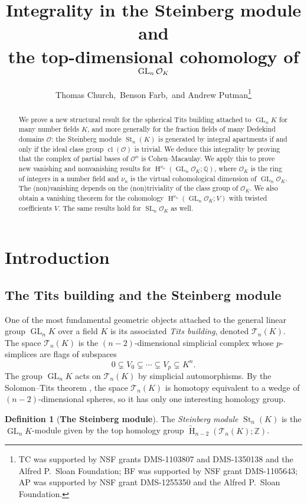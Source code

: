 \documentclass[11 pt]{article}
\title{Integrality in the Steinberg module and\\ the top-dimensional cohomology of $\GL_n \O_K$}
\author{Thomas Church,\ Benson Farb,\ and Andrew Putman\thanks{TC was supported by NSF grants DMS-1103807 and DMS-1350138 and the Alfred P.\ Sloan Foundation; BF was supported by NSF grant DMS-1105643; AP was supported by NSF grant DMS-1255350 and the Alfred P.\ Sloan Foundation.}\vspace{-6pt}}
\theoremstyle{plain}
\theoremstyle{definition}
\newtheorem{definition}[theorem]{Definition}
\numberwithin{equation}{section}
\DeclareMathOperator{\GL}{GL}
\DeclareMathOperator{\SL}{SL}
\newcommand\Z{\ensuremath{\mathbb{Z}}}
\newcommand\Q{\ensuremath{\mathbb{Q}}}
\DeclareMathOperator{\HH}{H}
\newcommand{\paranoskip}[1]{\noindent\textbf{#1.}}
\renewcommand{\O}{\mathcal{O}}
\DeclareMathOperator{\class}{cl}
\newcommand{\cl}{\class}
\newcommand\Tits{\ensuremath{\mathcal{T}}}
\DeclareMathOperator{\St}{St}
\newcommand\GLvcd{\nu_n}
\begin{document}
\maketitle

\begin{abstract}
We prove a new structural result for the spherical Tits building attached to $\GL_n K$ for many number fields $K$, and more generally for the fraction fields of many Dedekind domains $\O$:  the Steinberg module $\St_n(K)$ is generated by integral apartments if and only if the ideal class group $\cl(\O)$ is trivial.    We deduce this integrality by proving that the complex of partial bases of $\O^n$ is Cohen--Macaulay.  
We apply this to prove new vanishing and nonvanishing results for $\HH^{\GLvcd}(\GL_n\O_K;\Q)$, where $\O_K$ is the ring of integers in a number field and $\GLvcd$ is the virtual cohomological dimension of  $\GL_n\O_K$.   The (non)vanishing depends on the (non)triviality of the class group of $\O_K$.    We also obtain a vanishing theorem %
for the cohomology $\HH^{\GLvcd}(\GL_n\O_K;V)$ with twisted coefficients $V$. The same results hold for $\SL_n\O_K$ as well.
\end{abstract}

\section{Introduction}
\label{section:introduction}

\subsection{The Tits building and the Steinberg module}

One of the most fundamental geometric objects attached to the general linear group $\GL_n K$ over a field $K$ is its associated \emph{Tits building}, denoted $\Tits_n(K)$.  The space $\Tits_n(K)$ is the $(n-2)$-dimensional
simplicial complex whose $p$-simplices are flags of subspaces
\[0 \subsetneq V_0 \subsetneq \cdots \subsetneq V_p \subsetneq K^n.\]
The group $\GL_n K$ acts on $\Tits_n(K)$ by simplicial automorphisms.  
By the Solomon--Tits theorem \cite{SolomonChar}, the space $\Tits_n(K)$ is homotopy 
equivalent to a wedge of $(n-2)$-dimensional spheres, so it has
only one interesting homology group.

\begin{definition}[\textbf{The Steinberg module}]
\label{def:Steinberg}
The \emph{Steinberg module} $\St_n(K)$ %
is the $\GL_n K$-module given by the top homology group $\widetilde{\HH}_{n-2}(\Tits_n(K);\Z)$.
\end{definition}
\end{document}
